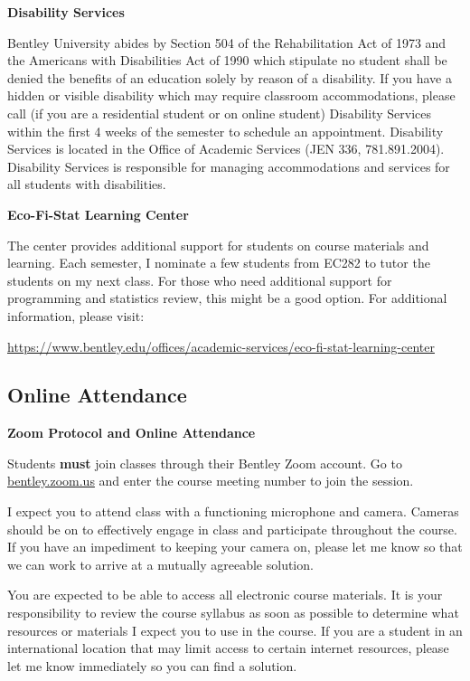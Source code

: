 \documentclass[
]{book}
\begin{document}
\textbf{Disability Services}

Bentley University abides by Section 504 of the Rehabilitation Act of 1973 and the Americans with Disabilities Act of 1990 which stipulate no student shall be denied the benefits of an education solely by reason of a disability. If you have a hidden or visible disability which may require classroom accommodations, please call (if you are a residential student or on online student) Disability Services within the first 4 weeks of the semester to schedule an appointment. Disability Services is located in the Office of Academic Services (JEN 336, 781.891.2004). Disability Services is responsible for managing accommodations and services for all students with disabilities.

\textbf{Eco-Fi-Stat Learning Center}

The center provides additional support for students on course materials and learning. Each semester, I nominate a few students from EC282 to tutor the students on my next class. For those who need additional support for programming and statistics review, this might be a good option. For additional information, please visit:

\url{https://www.bentley.edu/offices/academic-services/eco-fi-stat-learning-center}

\hypertarget{online-attendance}{%
\subsection*{Online Attendance}\label{online-attendance}}

\textbf{Zoom Protocol and Online Attendance}

Students \textbf{must} join classes through their Bentley Zoom account. Go to \href{https://bentley.zoom.us}{bentley.zoom.us} and enter the course meeting number to join the session.

I expect you to attend class with a functioning microphone and camera. Cameras should be on to effectively engage in class and participate throughout the course. If you have an impediment to keeping your camera on, please let me know so that we can work to arrive at a mutually agreeable solution.

You are expected to be able to access all electronic course materials. It is your responsibility to review the course syllabus as soon as possible to determine what resources or materials I expect you to use in the course. If you are a student in an international location that may limit access to certain internet resources, please let me know immediately so you can find a solution.
\end{document}
